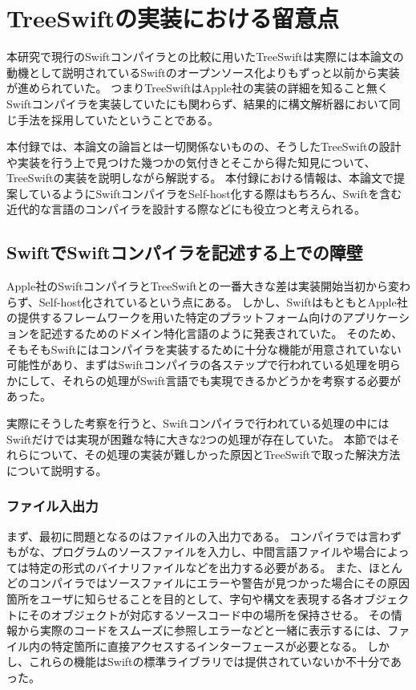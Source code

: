 \appendix
\chapter{TreeSwiftの実装における留意点}

本研究で現行のSwiftコンパイラとの比較に用いたTreeSwiftは実際には本論文の動機として説明されているSwiftのオープンソース化よりもずっと以前から実装が進められていた。
つまりTreeSwiftはApple社の実装の詳細を知ること無くSwiftコンパイラを実装していたにも関わらず、結果的に構文解析器において同じ手法を採用していたということである。

本付録では、本論文の論旨とは一切関係ないものの、そうしたTreeSwiftの設計や実装を行う上で見つけた幾つかの気付きとそこから得た知見について、TreeSwiftの実装を説明しながら解説する。
本付録における情報は、本論文で提案しているようにSwiftコンパイラをSelf-host化する際はもちろん、Swiftを含む近代的な言語のコンパイラを設計する際などにも役立つと考えられる。


\section{SwiftでSwiftコンパイラを記述する上での障壁}

Apple社のSwiftコンパイラとTreeSwiftとの一番大きな差は実装開始当初から変わらず、Self-host化されているという点にある。
しかし、SwiftはもともとApple社の提供するフレームワークを用いた特定のプラットフォーム向けのアプリケーションを記述するためのドメイン特化言語のように発表されていた。
そのため、そもそもSwiftにはコンパイラを実装するために十分な機能が用意されていない可能性があり、まずはSwiftコンパイラの各ステップで行われている処理を明らかにして、それらの処理がSwift言語でも実現できるかどうかを考察する必要があった。

実際にそうした考察を行うと、Swiftコンパイラで行われている処理の中にはSwiftだけでは実現が困難な特に大きな2つの処理が存在していた。
本節ではそれらについて、その処理の実装が難しかった原因とTreeSwiftで取った解決方法について説明する。

\subsection{ファイル入出力}

まず、最初に問題となるのはファイルの入出力である。
コンパイラでは言わずもがな、プログラムのソースファイルを入力し、中間言語ファイルや場合によっては特定の形式のバイナリファイルなどを出力する必要がある。
また、ほとんどのコンパイラではソースファイルにエラーや警告が見つかった場合にその原因箇所をユーザに知らせることを目的として、字句や構文を表現する各オブジェクトにそのオブジェクトが対応するソースコード中の場所を保持させる。
その情報から実際のコードをスムーズに参照しエラーなどと一緒に表示するには、ファイル内の特定箇所に直接アクセスするインターフェースが必要となる。
しかし、これらの機能はSwiftの標準ライブラリでは提供されていないか不十分であった。

